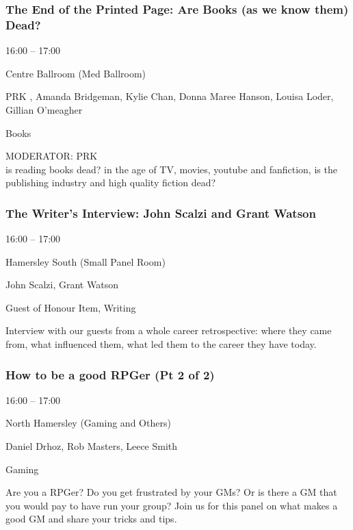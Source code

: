 \documentclass{scrreprt}
\begin{document}
\begin{multicols}{2}
\subsubsection*{The End of the Printed Page: Are Books (as we know them) Dead?}\begin{description}
\setlength{\itemsep}{0pt}
\setlength{\parsep}{0pt}
\setlength{\parskip}{0pt}
\item[Time:]{16:00 -- 17:00}
\item[Venue:]{Centre Ballroom (Med Ballroom)}
\item[People:]{PRK , Amanda Bridgeman, Kylie Chan, Donna Maree Hanson, Louisa Loder, Gillian O'meagher}
\item[Tags:]{Books}\end{description}
MODERATOR: PRK\\is reading books dead? in the age of TV, movies, youtube and fanfiction, is the publishing industry and high quality fiction dead?
\subsubsection*{The Writer's Interview: John Scalzi and Grant Watson}\begin{description}
\setlength{\itemsep}{0pt}
\setlength{\parsep}{0pt}
\setlength{\parskip}{0pt}
\item[Time:]{16:00 -- 17:00}
\item[Venue:]{Hamersley South (Small Panel Room)}
\item[People:]{John Scalzi, Grant Watson}
\item[Tags:]{Guest of Honour Item, Writing}\end{description}
Interview with our guests from a whole career retrospective: where they came from, what influenced them, what led them to the career they have today.
\subsubsection*{How to be a good RPGer (Pt 2 of 2)}\begin{description}
\setlength{\itemsep}{0pt}
\setlength{\parsep}{0pt}
\setlength{\parskip}{0pt}
\item[Time:]{16:00 -- 17:00}
\item[Venue:]{North Hamersley (Gaming and Others)}
\item[People:]{Daniel Drhoz, Rob Masters, Leece Smith}
\item[Tags:]{Gaming}\end{description}
Are you a RPGer? Do you get frustrated by your GMs? Or is there a GM that you would pay to have run your group? Join us for this panel on what makes a good GM and share your tricks and tips.

\end{multicols}
\end{document}
